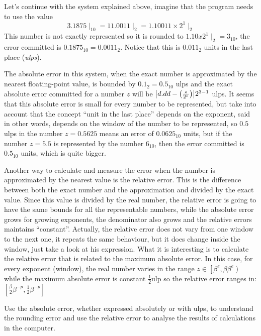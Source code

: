 Let's continue with the system explained above, imagine that the program needs to use the value 
$$
3.1875\mid_{10} = 11.0011\mid_2 = 1.10011\times 2^1\mid_2
$$
This number is not exactly represented so it is rounded to $1.10x2^1\mid_2 = 3_{10}$, the error committed is $0.1875_{10} = 0.0011_2$. 
Notice that this is $0.011_2$ units in the last place (\textit{ulps}). 


The absolute error in this system, when the exact number is 
approximated by the nearest floating-point value, is bounded by $0.1_2 = 0.5_{10}$ ulps and the exact absolute error committed for a number 
$z$ will be $\abs{d.dd-\left(\frac{z}{2^e}\right)} 2^{3-1}$ ulps. It seems that this absolute error is small for every number to be 
represented, but take into account that the concept ``unit in the last place'' depends on the exponent, said in other words, depends on the 
window of the number to be represented, so $0.5$ ulps in the number $z = 0.5625$ means an error of $0.0625_{10}$ units, but if the number $z 
= 5.5$ is represented by the number $6_{10}$, then the error committed is $0.5_{10}$ units, which is quite bigger. 

Another way to calculate and measure the error when the number is approximated by the nearest value is the relative error. This is the 
difference between both the exact number and the approximation and divided by the exact value. Since this value is divided by the real 
number, the relative error is going to have the same bounds for all the representable numbers, while the absolute error grows for growing 
exponents, the denominator also grows and the relative errors maintains ``constant''. Actually, the relative error does not vary from one 
window to the next one, it repeats the same behaviour, but it does change inside the window, just take a look at his expression. What it is 
interesting is to calculate the relative error that is related to the maximum absolute error. In this case, for every exponent (window), the 
real number varies in the range $z \in \left[\beta^e, \beta \beta^e\right)$ while the maximum absolute error is constant 
$\frac{1}{2}\textrm{ulp}$ so the relative error ranges in: $\left[\frac{\beta}{2}\beta^{-p}, \frac{1}{2}\beta^{-p} \right]$

\begin{IN}
    Use the absolute error, whether expressed absolutely or with ulps, to understand the rounding error and use the relative error to analyse 
    the results of calculations in the computer.
\end{IN}  

